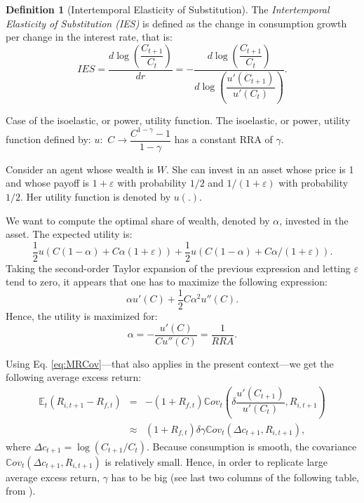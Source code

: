 \documentclass[
  12pt,
]{book}
\theoremstyle{definition}
\newtheorem{definition}{Definition}[chapter]
\theoremstyle{definition}
\theoremstyle{definition}
\theoremstyle{definition}
\theoremstyle{remark}
\begin{document}
\begin{definition}[Intertemporal Elasticity of Substitution]
\protect\hypertarget{def:IES}{}\label{def:IES}The \emph{Intertemporal Elasticity of Substitution (IES)} is defined as the change in consumption growth per change in the interest rate, that is:
\[
IES = \frac{d \log\left( \dfrac{C_{t+1}}{C_{t}}\right)}{d r} = - \frac{d \log\left( \dfrac{C_{t+1}}{C_{t}}\right)}{d\log\left(\dfrac{u'(C_{t+1})}{u'(C_{t})}\right)}.
\]
\end{definition}

Case of the isoelastic, or power, utility function. The isoelastic, or power, utility function defined by: \(u:\) \(C \rightarrow \dfrac{C^{1 - \gamma}-1}{1-\gamma}\) has a constant RRA of \(\gamma\).

Consider an agent whose wealth is \(W\). She can invest in an asset whose price is 1 and whose payoff is \(1+\varepsilon\) with probability \(1/2\) and \(1/(1+\varepsilon)\) with probability \(1/2\). Her utility function is denoted by \(u(.)\).

We want to compute the optimal share of wealth, denoted by \(\alpha\), invested in the asset. The expected utility is:
\[
\frac{1}{2}u\left(C(1-\alpha)+C\alpha(1+\varepsilon)\right) + \frac{1}{2}u\left(C(1-\alpha)+C\alpha/(1+\varepsilon)\right).
\]
Taking the second-order Taylor expansion of the previous expression and letting \(\varepsilon\) tend to zero, it appears that one has to maximize the following expression:
\[
\alpha u'(C) + \frac{1}{2}C \alpha^2 u''(C).
\]
Hence, the utility is maximized for:
\[
\alpha = - \frac{u'(C)}{C u''(C)} = \frac{1}{RRA}.
\]

Using Eq. \eqref{eq:MRCov}---that also applies in the present context---we get the following average excess return:
\begin{eqnarray*}
\mathbb{E}_t(R_{i,t+1} - R_{f,t}) &=& - (1 + R_{f,t}) \mathbb{C}ov_t\left(\delta \dfrac{u'(C_{t+1})}{u'(C_{t})},R_{i,t+1}\right)\\
&\approx& (1 + R_{f,t}) \delta \gamma  \mathbb{C}ov_t\left(\Delta c_{t+1},R_{i,t+1}\right),
\end{eqnarray*}
where \(\Delta c_{t+1} = \log(C_{t+1}/C_t)\).
Because consumption is smooth, the covariance \(\mathbb{C}ov_t\left(\Delta c_{t+1},R_{i,t+1}\right)\) is relatively small.
Hence, in order to replicate large average excess return, \(\gamma\) has to be big (see last two columns of the following table, from \citet{Campbell_1999}).
\end{document}
